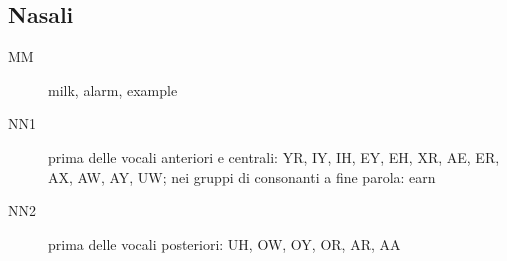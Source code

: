 \subsection{Nasali}
\begin{description}
\item[MM] milk, alarm, example
\item[NN1] prima delle vocali anteriori e centrali: YR, IY, IH, EY, EH, XR, AE, ER, AX, AW, AY, UW; nei gruppi di consonanti a fine parola: earn
\item[NN2] prima delle vocali posteriori: UH, OW, OY, OR, AR, AA
\end{description}



